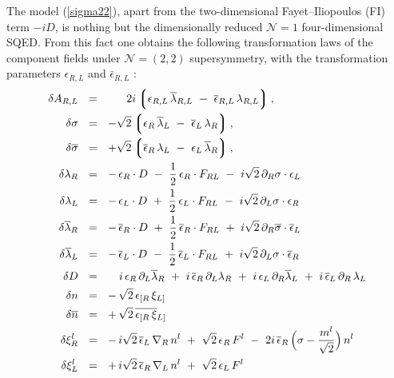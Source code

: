 \documentclass[12pt]{article}
\newcommand{\ntwot}{${\mathcal N}= \left(2,2\right) $ }
\newcommand{\none}{${\mathcal N}=1$ }
\newcommand{\p}{\partial}
\newcommand{\ov}{\overline}
\newcommand{\lgr}{\left\lgroup}
\newcommand{\rgr}{\right\rgroup}
\newcommand{\lar}{\lambda_R}
\newcommand{\lal}{\lambda_L}
\newcommand{\larl}{\lambda_{R,L}}
\newcommand{\blar}{\ov{\lambda}{}_R}
\newcommand{\blal}{\ov{\lambda}{}_L}
\newcommand{\blarl}{\ov{\lambda}{}_{R,L}}
\newcommand{\eer}{\epsilon_R}
\newcommand{\eel}{\epsilon_L}
\newcommand{\eerl}{\epsilon_{R,L}}
\newcommand{\beer}{\ov{\epsilon}{}_R}
\newcommand{\beel}{\ov{\epsilon}{}_L}
\newcommand{\beerl}{\ov{\epsilon}{}_{R,L}}
\begin{document}
     The model (\ref{sigma22}),
      apart from the two-dimensional Fayet--Iliopoulos (FI) term $ - i D $, is nothing but
        the dimensionally reduced \none four-dimensional SQED.
        From this fact one obtains the following transformation laws of the component fields under 
        \ntwot supersymmetry, with the transformation parameters $\epsilon_{R,L}$ and 
      $\bar{\epsilon}_{R,L}$  :
\begin{align}
%
\notag
  \delta A_{R,L} & ~~=~~ ~~~~~ 2i \lgr  \eerl\, \blarl
                              ~-~ \beerl\, \larl \rgr  , \\
%
\notag
  \delta\sigma & ~~=~~ -\sqrt{2}
                              \lgr \eer\, \blal ~-~ \beel\,\lar \rgr , 
                              \\
%
\notag
  \delta\ov{\sigma} & ~~=~~ +\sqrt{2}
                              \lgr \beer\,\lal ~-~ \eel\,\blar \rgr ,
                              \\
%
\notag
  \delta\lar & ~~=~~ -\,\eer\cdot D ~-~ \frac{1}{2}\,\eer\cdot F_{RL} 
                     ~-~ i\sqrt{2}\, \p_R\sigma \cdot \eel
                     \\
%
\notag
  \delta\lal & ~~=~~ -\,\eel\cdot D ~+~ \frac{1}{2}\,\eel\cdot F_{RL} 
                     ~-~ i\sqrt{2}\, \p_L\sigma \cdot \eer
                     \\
%
\notag
  \delta\blar & ~~=~~ -\,\beer\cdot D ~+~ \frac{1}{2}\,\beer\cdot F_{RL} 
                     ~+~ i\sqrt{2}\, \p_R\ov{\sigma} \cdot \beel
                     \\
%
\notag
  \delta\blal & ~~=~~ -\,\beel\cdot D ~-~ \frac{1}{2}\,\beel\cdot F_{RL}
                     ~+~ i\sqrt{2}\, \p_L\sigma \cdot \beer
                     \\
%
\notag
  \delta D & ~~=~~ ~~~i\,\eer\, \p_L \blar ~+~ i\,\beer\, \p_L\lar 
                   ~+~ i\,\eel\, \p_R \blal ~+~ i\,\beel\,\p_R\,\lal
                   \\
%
\label{msusy}
  \delta n & ~~=~~ -\,\sqrt{2}\, \epsilon_{[R}\, \xi_{L]} 
                   \\
%
\notag
  \delta\ov{n} & ~~=~~ +\,\sqrt{2}\,\ov{\epsilon_{[R}\, \xi}{}_{L]}
                   \\
%
\notag
  \delta\xi_R^l & ~~=~~
     -\, i\sqrt{2}\, \beel\, \nabla_R\, n^l ~+~ \sqrt{2}\, \eer\, F^l 
     ~-~ 2i\, \beer\, \Bigl(\sigma - \frac{m^l}{\sqrt{2}}\Bigr)\, n^l
     \\
%
\notag
  \delta\xi_L^l & ~~=~~
     +\, i\sqrt{2}\, \beer\, \nabla_L\, n^l ~+~ \sqrt{2}\, \eel\, F^l

\end{align}
\end{document}
